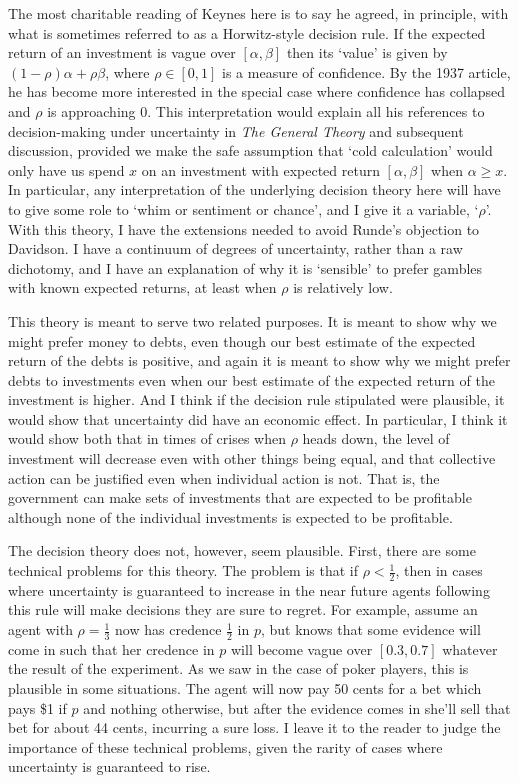 \noindent The most charitable reading of Keynes here is to say he agreed, in principle, with what is sometimes referred to as a Horwitz-style decision rule. If the expected return of an investment is vague over \([\alpha, \beta]\) then its `value' is given by \((1-\rho)\alpha + \rho \beta\), where \(\rho \in [0, 1]\) is a measure of confidence. By the 1937 article, he has become more interested in the special case where confidence has collapsed and \(\rho\) is approaching 0. This interpretation would explain all his references to decision-making under uncertainty in \textit{The General Theory} and subsequent discussion, provided we make the safe assumption that `cold calculation' would only have us spend \(x\) on an investment with expected return \([\alpha, \beta]\) when \(\alpha \geq x\). In particular, any interpretation of the underlying decision theory here will have to give some role to `whim or sentiment or chance', and I give it a variable, `\(\rho\)'. With this theory, I have the extensions needed to avoid Runde's objection to Davidson. I have a continuum of degrees of uncertainty, rather than a raw dichotomy, and I have an explanation of why it is `sensible' to prefer gambles with known expected returns, at least when \(\rho\) is relatively low.

This theory is meant to serve two related purposes. It is meant to show why we might prefer money to debts, even though our best estimate of the expected return of the debts is positive, and again it is meant to show why we might prefer debts to investments even when our best estimate of the expected return of the investment is higher. And I think if the decision rule stipulated were plausible, it would show that uncertainty did have an economic effect. In particular, I think it would show both that in times of crises when \(\rho\) heads down, the level of investment will decrease even with other things being equal, and that collective action can be justified even when individual action is not. That is, the government can make sets of investments that are expected to be profitable although none of the individual investments is expected to be profitable.

The decision theory does not, however, seem plausible. First, there are some technical problems for this theory. The problem is that if \(\rho < \frac{1}{2}\), then in cases where uncertainty is guaranteed to increase in the near future agents following this rule will make decisions they are sure to regret. For example, assume an agent with \(\rho = \frac{1}{3}\) now has credence \(\frac{1}{2}\) in \(p\), but knows that some evidence will come in such that her credence in \(p\) will become vague over \([0.3, 0.7]\) whatever the result of the experiment. As we saw in the case of poker players, this is plausible in some situations. The agent will now pay 50 cents for a bet which pays \$1 if \(p\) and nothing otherwise, but after the evidence comes in she'll sell that bet for about 44 cents, incurring a sure loss. I leave it to the reader to judge the importance of these technical problems, given the rarity of cases where uncertainty is guaranteed to rise.

